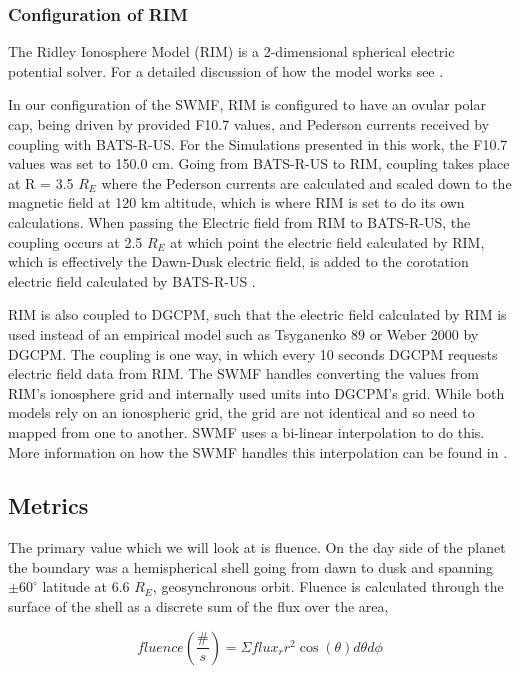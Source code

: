 \documentclass[utf8]{frontiersinFPHY_FAMS}
\begin{document}
\subsubsection{Configuration of RIM}

The Ridley Ionosphere Model (RIM) is a 2-dimensional spherical electric potential solver. For a detailed discussion of how the model works see \citet{Ridley2002}.

In our configuration of the SWMF, RIM is configured to have an ovular polar cap, being driven by provided F10.7 values, and Pederson currents received by coupling with BATS-R-US. For the Simulations presented in this work, the F10.7 values was set to 150.0 cm. Going from BATS-R-US to RIM, coupling takes place at R = 3.5 $R_{E}$ where the Pederson currents are calculated and scaled down to the magnetic field at 120 km altitude, which is where RIM is set to do its own calculations. When passing the Electric field from RIM to BATS-R-US, the coupling occurs at 2.5 $R_{E}$ at which point the electric field calculated by RIM, which is effectively the Dawn-Dusk electric field, is added to the corotation electric field calculated by BATS-R-US \citet{Toth2005}. %

RIM is also coupled to DGCPM, such that the electric field calculated by RIM is used instead of an empirical model such as Tsyganenko 89 or Weber 2000 by DGCPM. The coupling is one way, in which every 10 seconds DGCPM requests electric field data from RIM. The SWMF handles converting the values from RIM's ionosphere grid and internally used units into DGCPM's grid. While both models rely on an ionospheric grid, the grid are not identical and so need to mapped from one to another. SWMF uses a bi-linear interpolation to do this. More information on how the SWMF handles this interpolation can be found in \citet[Toth et al.()]{Toth2005}.

\subsection{Metrics}

The primary value which we will look at is fluence. On the day side of the planet the boundary was a hemispherical shell going from dawn to dusk and spanning $\pm 60^{\circ}$ latitude at 6.6 $R_{E}$, geosynchronous orbit. Fluence is calculated through the surface of the shell as a discrete sum of the flux over the area, 

\begin{equation}
    fluence (\frac{\#}{s}) = \Sigma flux_{r} r^{2} \cos(\theta) d\theta d\phi
    \label{eq:A1}
\end{equation}
\end{document}
